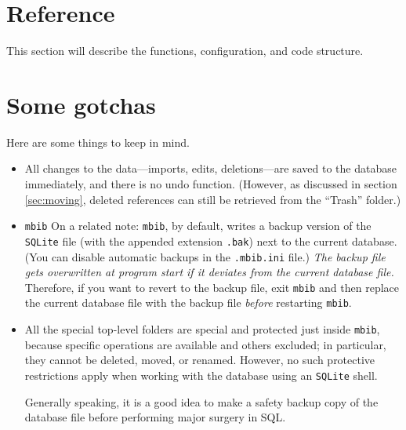 \documentclass[10pt]{article}
\newcommand*{\mbib}{\texttt{mbib}\xspace}
\newcommand*{\sqlite}{\texttt{SQLite}\xspace}
\newcommand*{\ini}{\texttt{.mbib.ini}\xspace}
\begin{document}
\section{Reference} 

This section will describe the functions, configuration, and code structure. 

\section{Some gotchas}

Here are some things to keep in mind. 

\begin{itemize}


\item All changes to the data---imports, edits, deletions---are saved to the database immediately, and there is no undo function. (However, as discussed in section \ref{sec:moving}, deleted references can still be retrieved from the ``Trash'' folder.)

\item \mbib On a related note: \mbib, by default, writes a backup version of the \sqlite file (with the appended extension \texttt{.bak}) next to the current database. (You can disable automatic backups in the \ini file.)  \emph{The backup file gets overwritten at program start if it deviates from the current database file.} Therefore, if you want to revert to the backup file, exit \mbib and then replace the current database file with the backup file \emph{before} restarting \mbib.



\item All the special top-level folders are special and protected just inside \mbib, because specific operations are available and others excluded; in particular, they cannot be deleted, moved, or renamed. However, no such protective restrictions apply when working with the database using an \sqlite shell. 

Generally speaking, it is a good idea to make a safety backup copy of the database file before performing major surgery in SQL. 
\end{itemize}
\end{document}
